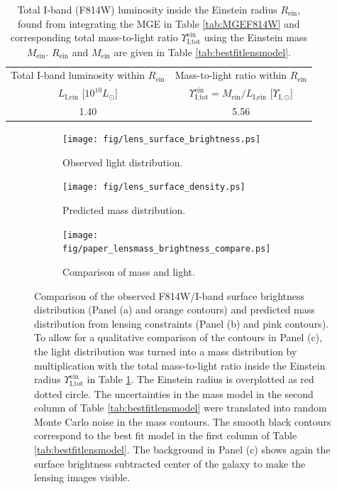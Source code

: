 
\begin{table}
\centering
\caption{Total I-band (F814W) luminosity inside the Einstein radius $R_\text{ein}$, found from integrating the MGE in Table \ref{tab:MGEF814W} and corresponding total mass-to-light ratio $\Upsilon_\text{I,tot}^\text{ein}$ using the Einstein mass $M_\text{ein}$. $R_\text{ein}$ and $M_\text{ein}$ are given in Table \ref{tab:bestfitlensmodel}. }
\begin{tabular}{cc}
\hline
Total I-band luminosity within $R_\text{ein}$ & Mass-to-light ratio within $R_\text{ein}$\\
 $L_\text{I,ein}$ [$10^{10} L_\odot$] & $\Upsilon_\text{I,tot}^\text{ein} = M_\text{ein} / L_\text{I,ein}$ [$\Upsilon_{\text{I},\odot}$]\\\hline
1.40 & 5.56\\\hline
\end{tabular}  
\label{tab:einsteinML} 
\end{table}


\begin{figure}
\centering
\begin{subfigure}{.3\textwidth}
  \centering
  \texttt{[image: fig/lens\_surface\_brightness.ps]}
  \caption{Observed light distribution.}
  \label{fig:lenscomparelight}
\end{subfigure}%
\begin{subfigure}{.3\textwidth}
  \centering
  \texttt{[image: fig/lens\_surface\_density.ps]}
  \caption{Predicted mass distribution.}
  \label{fig:lenscomparemass}
\end{subfigure}
\begin{subfigure}{.3\textwidth}
  \centering
  \texttt{[image: fig/paper\_lensmass\_brightness\_compare.ps]}
  \caption{Comparison of mass and light.}
  \label{fig:lenscompareboth}
\end{subfigure}
\caption{Comparison of the observed F814W/I-band surface brightness distribution (Panel (a) and orange contours) and predicted mass distribution from lensing constraints (Panel (b) and pink contours). To allow for a qualitative comparison of the contours in Panel (c), the light distribution was turned into a mass distribution by multiplication with the total mass-to-light ratio inside the Einstein radius $\Upsilon_\text{I,tot}^\text{ein}$ in Table \ref{tab:einsteinML}. The Einstein radius is overplotted as red dotted circle. The uncertainties in the mass model in the second column of Table \ref{tab:bestfitlensmodel} were translated into random Monte Carlo noise in the mass contours. The smooth black contours correspond to the best fit model in the first column of Table \ref{tab:bestfitlensmodel}. The background in Panel (c) shows again the surface brightness subtracted center of the galaxy to make the lensing images visible. }
\label{fig:lenslightcompareALL}
\end{figure}

